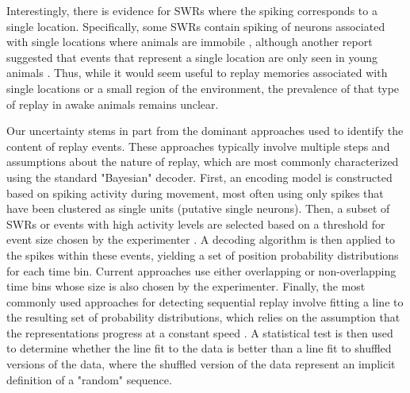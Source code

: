 \documentclass[9pt,lineno]{elife}
\begin{document}
Interestingly, there is evidence for SWRs where the spiking corresponds to a single location. Specifically, some SWRs contain spiking of neurons associated with single locations where animals are immobile \citep{YuDistincthippocampalcorticalmemory2017}, although another report suggested that events that represent a single location are only seen in young animals \citep{FarooqEmergencepreconfiguredplastic2019}. Thus, while it would seem useful to replay memories associated with single locations or a small region of the environment, the prevalence of that type of replay in awake animals remains unclear.

Our uncertainty stems in part from the dominant approaches used to identify the content of replay events. These approaches typically involve multiple steps and assumptions about the nature of replay, which are most commonly characterized using the standard "Bayesian" decoder. First, an encoding model is constructed based on spiking activity during movement, most often using only spikes that have been clustered as single units (putative single neurons). Then, a subset of SWRs or events with high activity levels are selected based on a threshold for event size chosen by the experimenter \citep{FosterReversereplaybehavioural2006, DibaForwardreversehippocampal2007a, KarlssonAwakereplayremote2009, StellaHippocampalReactivationRandom2019}. A decoding algorithm is then applied to the spikes within these events, yielding a set of position probability distributions for each time bin. Current approaches use either overlapping or non-overlapping time bins whose size is also chosen by the experimenter. Finally, the most commonly used approaches for detecting sequential replay involve fitting a line to the resulting set of probability distributions, which relies on the assumption that the representations progress at a constant speed \citep{FosterReversereplaybehavioural2006, DibaForwardreversehippocampal2007a, KarlssonAwakereplayremote2009, TingleyRoutingHippocampalRipples2020, BhattaraiDistincteffectsreward2020, ShinDynamicsAwakeHippocampalPrefrontal2019, DrieuNestedsequenceshippocampal2018, OlafsdottirTaskDemandsPredict2017, TangHippocampalPrefrontalReactivationLearning2017, CarrTransientSlowGamma2012, DavidsonHippocampalReplayExtended2009, KarlssonAwakereplayremote2009}. A statistical test is then used to determine whether the line fit to the data is better than a line fit to shuffled versions of the data, where the shuffled version of the data represent an implicit definition of a "random" sequence.
\end{document}
